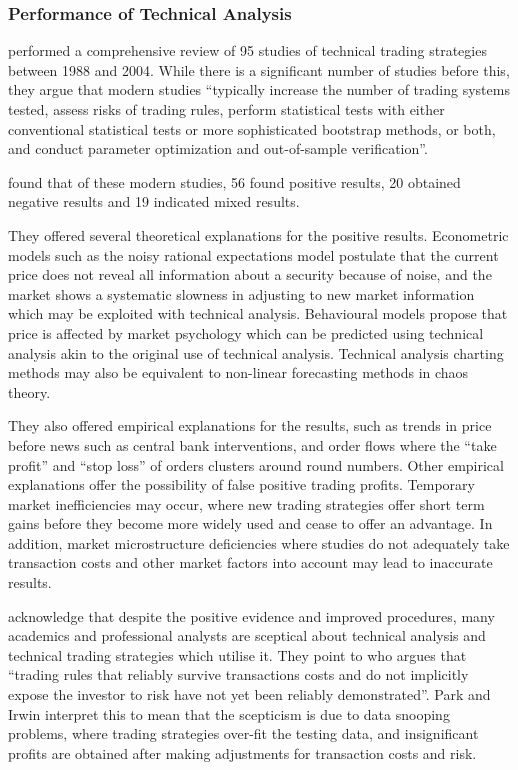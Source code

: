 \documentclass[12pt, oneside, a4paper]{article}
\theoremstyle{definition}
\begin{document}
\subsubsection{Performance of Technical Analysis}
\label{taperformance}
\cite{taprofitability} performed a comprehensive review of 95 studies of technical trading strategies between 1988 and 2004. While there is a significant number of studies before this, they argue that modern studies ``typically increase the number of trading systems tested, assess risks of trading rules,
perform statistical tests with either conventional statistical tests or more sophisticated bootstrap methods, or both, and conduct parameter optimization and out-of-sample verification''.

\cite{taprofitability} found that of these modern studies, 56 found positive results, 20 obtained negative results and 19 indicated mixed results. 

They offered several theoretical explanations for the positive results. Econometric models such as the noisy rational expectations model postulate that the current price does not reveal all information about a security because of noise, and the market shows a systematic slowness in adjusting to new market information which may be exploited with technical analysis. Behavioural models propose that price is affected by market psychology which can be predicted using technical analysis akin to the original use of technical analysis. Technical analysis charting methods may also be equivalent to non-linear forecasting methods in chaos theory.

They also offered empirical explanations for the results, such as trends in price before news such as central bank interventions, and order flows where the ``take profit'' and ``stop loss'' of orders clusters around round numbers. Other empirical explanations offer the possibility of false positive trading profits. Temporary market inefficiencies may occur, where new trading strategies offer short term gains before they become more widely used and cease to offer an advantage. In addition, market microstructure deficiencies where studies do not adequately take transaction costs and other market factors into account may lead to inaccurate results. 

\cite{taprofitability} acknowledge that despite the positive evidence and improved procedures, many academics and professional analysts are sceptical about technical analysis and technical trading strategies which utilise it. They point to \citet[p.~25]{assetpricing} who argues that ``trading rules that reliably survive transactions costs and do not implicitly expose the investor to risk have not yet been reliably demonstrated''. Park and Irwin interpret this to mean that the scepticism is due to data snooping problems, where trading strategies over-fit the testing data, and insignificant profits are obtained after making adjustments for transaction costs and risk.
\end{document}
